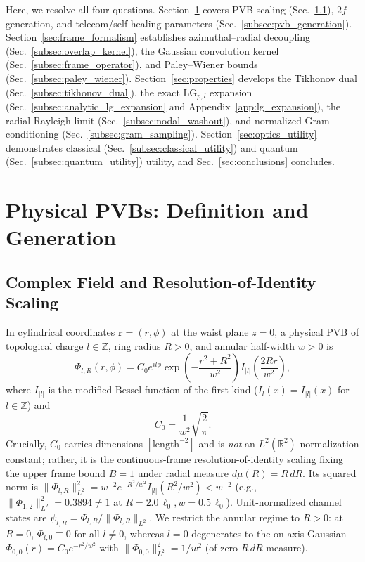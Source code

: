 \documentclass[aps,pra,onecolumn,notitlepage,11pt,tightenlines,amsmath,amssymb,floatfix,longbibliography]{revtex4-2}
\providecommand{\abs}[1]{\lvert#1\rvert}
\providecommand{\norm}[1]{\lVert#1\rVert}
\begin{document}
Here, we resolve all four questions. Section~\ref{sec:pvb_formation} covers PVB scaling (Sec.~\ref{subsec:pvb_def}), $2f$ generation, and telecom/self-healing parameters (Sec.~\ref{subsec:pvb_generation}). Section~\ref{sec:frame_formalism} establishes azimuthal--radial decoupling (Sec.~\ref{subsec:overlap_kernel}), the Gaussian convolution kernel (Sec.~\ref{subsec:frame_operator}), and Paley--Wiener bounds (Sec.~\ref{subsec:paley_wiener}). Section~\ref{sec:properties} develops the Tikhonov dual (Sec.~\ref{subsec:tikhonov_dual}), the exact $\mathrm{LG}_{p,l}$ expansion (Sec.~\ref{subsec:analytic_lg_expansion} and Appendix~\ref{app:lg_expansion}), the radial Rayleigh limit (Sec.~\ref{subsec:nodal_washout}), and normalized Gram conditioning (Sec.~\ref{subsec:gram_sampling}). Section~\ref{sec:optics_utility} demonstrates classical (Sec.~\ref{subsec:classical_utility}) and quantum (Sec.~\ref{subsec:quantum_utility}) utility, and Sec.~\ref{sec:conclusions} concludes.

\section{Physical PVBs: Definition and Generation}
\label{sec:pvb_formation}

\subsection{Complex Field and Resolution-of-Identity Scaling}
\label{subsec:pvb_def}

In cylindrical coordinates $\mathbf{r} = (r,\phi)$ at the waist plane $z=0$, a physical PVB of topological charge $l \in \mathbb{Z}$, ring radius $R > 0$, and annular half-width $w > 0$ is~\cite{Ostrovsky2013,Vaity2015}
\begin{equation}
\Phi_{l,R}(r,\phi) = C_0 e^{il\phi} \exp\!\left(-\frac{r^2 + R^2}{w^2}\right) I_{\abs{l}}\!\left(\frac{2Rr}{w^2}\right),
\label{eq:pvb_mode}
\end{equation}
where $I_{\abs{l}}$ is the modified Bessel function of the first kind ($I_l(x) = I_{\abs{l}}(x)$ for $l \in \mathbb{Z}$) and
\begin{equation}
C_0 = \frac{1}{w^2}\sqrt{\frac{2}{\pi}}.
\label{eq:C0_norm}
\end{equation}
Crucially, $C_0$ carries dimensions $[\mathrm{length}^{-2}]$ and is \emph{not} an $L^2(\mathbb{R}^2)$ normalization constant; rather, it is the continuous-frame resolution-of-identity scaling fixing the upper frame bound $B = 1$ under radial measure $d\mu(R) = R\,dR$. Its squared norm is $\norm{\Phi_{l,R}}_{L^2}^2 = w^{-2} e^{-R^2/w^2} I_{\abs{l}}(R^2/w^2) < w^{-2}$ (e.g., $\norm{\Phi_{1,2}}_{L^2}^2 = 0.3894 \neq 1$ at $R=2.0\,\ell_0, w=0.5\,\ell_0$). Unit-normalized channel states are $\psi_{l,R} = \Phi_{l,R}/\norm{\Phi_{l,R}}_{L^2}$. We restrict the annular regime to $R > 0$: at $R=0$, $\Phi_{l,0} \equiv 0$ for all $l \neq 0$, whereas $l=0$ degenerates to the on-axis Gaussian $\Phi_{0,0}(r) = C_0 e^{-r^2/w^2}$ with $\norm{\Phi_{0,0}}_{L^2}^2 = 1/w^2$ (of zero $R\,dR$ measure).
\end{document}
